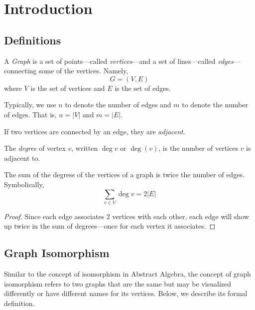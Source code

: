 \chapter{Introduction}

\section{Definitions}

\begin{definition}[Graph]
  A \textit{Graph} is a set of points---called \textit{vertices}---and a set of lines---called \textit{edges}---connecting some of the vertices. Namely, 
  \begin{displaymath}
    G = (V, E)
  \end{displaymath}
  where \(V\) is the set of vertices and \(E\) is the set of edges.

  Typically, we use \(n\) to denote the number of edges and \(m\) to denote the number of edges. That is, \(n = |V| \text{ and } m = |E|\).
\end{definition}

\begin{definition}[Adjacency]
  If two vertices are connected by an edge, they are \textit{adjacent}. 
\end{definition}

\begin{definition}[Degree]
  The \textit{degree} of vertex \(v\), written \(\deg{v}\) or \(\deg(v)\), is
  the number of vertices \(v\) is adjacent to. 
\end{definition}

\begin{lemma}
  The sum of the degress of the vertices of a graph is twice the number of edges. Symbolically,
  \[ \sum_{v \in V} \deg{v} = 2|E| \]
\end{lemma}

\begin{proof}
  Since each edge associates 2 vertices with each other, each edge will show up twice in the sum of degrees---once for each vertex it associates.
\end{proof}

\section{Graph Isomorphism}

Similar to the concept of isomorphism in Abstract Algebra, the concept of graph
isomorphism refers to two graphs that are the same but may be visualized 
differently or have different names for its vertices. Below, we describe its 
formal definition.

